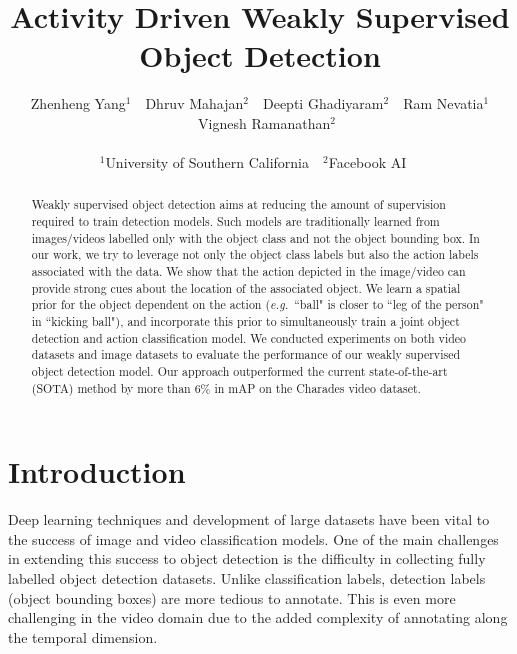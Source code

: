 \documentclass[10pt,twocolumn,letterpaper]{article}
\def\eg{\emph{e.g.}}
\begin{document}
\title{Activity Driven Weakly Supervised Object Detection}


\author{
Zhenheng Yang$^{1}$~~Dhruv Mahajan$^{2}$~~Deepti Ghadiyaram$^{2}$~~Ram Nevatia$^{1}$\\
~~Vignesh Ramanathan$^{2}$\\
\\
$^{1}$University of Southern California~~$^{2}$Facebook AI~~\\
}

\maketitle
\vspace{-0.5\baselineskip}
\begin{abstract}
\vspace{-0.6\baselineskip}
    Weakly supervised object detection aims at reducing the amount of supervision required to train detection models. Such models are traditionally learned from images/videos labelled only with the object class and not the object bounding box. In our work, we try to leverage not only the object class labels but also the action labels associated with the data. We show that the action depicted in the image/video can provide strong cues about the location of the associated object. We learn a spatial prior for the object dependent on the action (\eg~``ball" is closer to ``leg of the person" in ``kicking ball"), and incorporate this prior to simultaneously train a joint object detection and action classification model. We conducted experiments on both video datasets and image datasets to evaluate the performance of our weakly supervised object detection model. Our approach outperformed the current state-of-the-art (SOTA) method by more than 6\% in mAP on the Charades video dataset.

    




\vspace{-0.3\baselineskip}
\end{abstract}
 \vspace{-1.0\baselineskip}
\section{Introduction}
\vspace{-0.4\baselineskip}
\label{sec:intro}

Deep learning techniques and development of large datasets have been vital to the success of image and video classification models. One of the main challenges in extending this success to object detection is the difficulty in collecting fully labelled object detection datasets. Unlike classification labels, detection labels (object bounding boxes) are more tedious to annotate. This is even more challenging in the video domain due to the added complexity of annotating along the temporal dimension.
\end{document}
